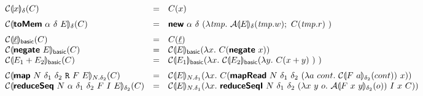 \begin{figure}
  \begin{displaymath}
    \begin{array}{lcl}
      \semE{x}_\delta(C)
      &=& C(x)
      \medskip\\

      \semE{\prim{toMem}~\alpha~\delta~E}_{\delta}(C)
        &=& \prim{new}~\alpha~\delta~(\lambda \mathit{tmp}.~\semA{E}_{\delta}(\mathit{tmp}.w);~C(\mathit{tmp}.r)~)
      \medskip\\

      \semE{\underline{\ell}}_{\basic}(C)
      &=& C(\underline{\ell})
      \\
      \semE{\prim{negate}~E}_{\basic}(C)
      &=& \semE{E}_{\basic}(\lambda x.~C(\prim{negate}~x))
      \\
      \semE{E_1 + E_2}_{\basic}(C)
      &=& \semE{E_1}_{\basic}(\lambda x.~\semE{E_2}_{\basic}(\lambda y.~C(x+y)~)~)
      \medskip\\

      \semE{\prim{map}~N~\delta_1~\delta_2~\readacc~F~E}_{N.\delta_2}(C)
        &=& \semE{E}_{N.\delta_1}(\lambda x.~C(\prim{mapRead}~N~\delta_1~\delta_2~(\lambda a~cont.~\semE{F~a}_{\delta_2}(cont))~x))
      \\
      \semE{\prim{reduceSeq}~N~\alpha~\delta_1~\delta_2~F~I~E}_{\delta_2}(C)
      &=& \begin{array}[t]{@{}l}
            \semE{E}_{N.\delta_1}(\lambda x.~
          \prim{reduceSeqI}~N~\delta_1~\delta_2~(\lambda x~y~o.~\semA{F~x~y}_{\delta_2}(o))~I~x~C))
          \end{array}
      \medskip\\


\end{array}
\end{displaymath}
\end{figure}
